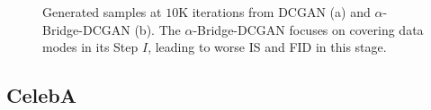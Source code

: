 \documentclass[letterpaper]{article} %
\begin{document}
\begin{figure}[H]
	\begin{center}
		\caption{\small Generated samples at $10$K iterations from DCGAN (a) and $\alpha$-Bridge-DCGAN (b). The $\alpha$-Bridge-DCGAN focuses on covering data modes in its Step $I$, leading to worse IS and FID in this stage.
		}
		\label{fig:CIFAR10_gen_sample_beginning}
	\end{center}
\end{figure}





\subsection{CelebA}\label{sec:app_exp_celeba}
\end{document}
